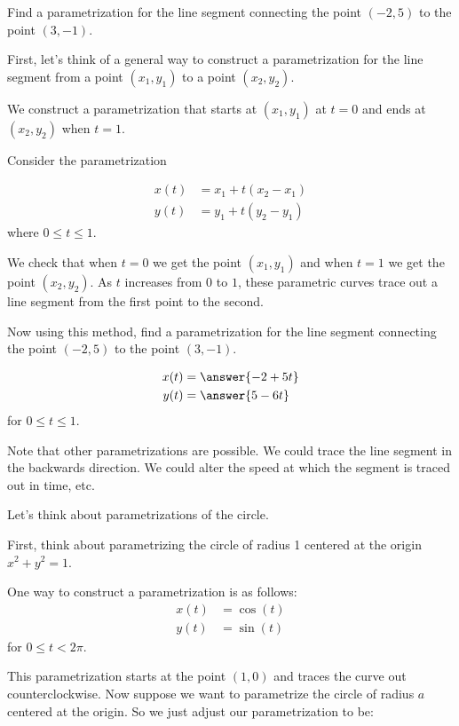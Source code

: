 \documentclass{ximera}
\author{Jason Miller}
\begin{document}
\begin{exercise}

Find a parametrization for the line segment connecting the point $(-2, 5)$ to the point $(3,-1)$. 

First, let's think of a general way to construct a parametrization for the line segment from a point $(x_{1}, y_{1})$ to a point $(x_{2}, y_{2})$. 

We construct a parametrization that starts at $(x_{1}, y_{1})$ at  $t=0$ and ends at $(x_{2}, y_{2})$ when $t=1$. 

Consider the parametrization

\begin{align*}
 x(t)&=x_{1}+t(x_{2}-x_{1}) \\
y(t)&=y_{1}+t(y_{2}-y_{1})
\end{align*}
where $0\leq t \leq 1$.

We check that when $t=0$ we get the point $(x_{1}, y_{1})$ and when $t=1$ we get the point $(x_{2}, y_{2})$. As $t$ increases from $0$ to $1$, these parametric curves trace out a line segment from the first point to the second. 

Now using this method, find a parametrization for the line segment connecting the point $(-2, 5)$ to the point $(3, -1)$. 

\begin{align*}
x(t)&=\answer{-2 +5t    } \\
y(t)&=\answer{ 5-6t   }
\end{align*}
for $0 \leq t \leq 1$. 

Note that other parametrizations are possible. We could trace the line segment in the backwards direction. We could alter the speed at which the segment is traced out in time, etc. 

\begin{exercise}

Let's think about parametrizations of the circle. 

First, think about parametrizing the circle of radius 1 centered at the origin $x^2+y^2=1$. 

One way to construct a parametrization is as follows:
\begin{align*}
x(t)&=\cos(t)\\
y(t)&=\sin(t)
\end{align*}
for $0 \leq t < 2\pi$. 

This parametrization starts at the point $(1,0)$ and traces the curve out counterclockwise. 
Now suppose we want to parametrize the circle of radius $a$ centered at the origin. So we just adjust our parametrization to be:


\end{exercise}
\end{exercise}
\end{document}

